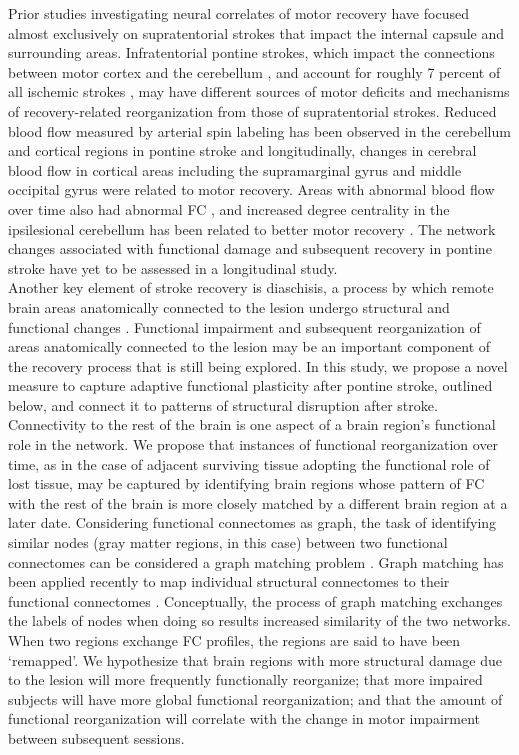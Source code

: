 \documentclass[10pt]{article}
\begin{document}
	Prior studies investigating neural correlates of motor recovery have focused almost exclusively on supratentorial strokes that impact the internal capsule and surrounding areas.  Infratentorial pontine strokes, which impact the connections between motor cortex and the cerebellum \cite{Lu2011-ow}, and account for roughly 7 percent of all ischemic strokes \cite{Saia2009-ik}, may have different sources of motor deficits and mechanisms of recovery-related reorganization from those of supratentorial strokes. Reduced blood flow measured by arterial spin labeling has been observed in the cerebellum and cortical regions in pontine stroke \cite{Wei2020-gj, Wang2019-jr} and longitudinally, changes in cerebral blood flow in cortical areas including the supramarginal gyrus and middle occipital gyrus were related to motor recovery.  Areas with abnormal blood flow over time also had abnormal FC \cite{Wei2020-gj}, and increased degree centrality in the ipsilesional cerebellum has been related to better motor recovery \cite{Liu2019-mj}. The network changes associated with functional damage and subsequent recovery in pontine stroke have yet to be assessed in a longitudinal study.
	\\
	
	Another key element of stroke recovery is diaschisis, a process by which remote brain areas anatomically connected to the lesion undergo structural and functional changes \cite{Carrera2014-ah}. Functional impairment and subsequent reorganization of areas anatomically connected to the lesion may be an important component of the recovery process that is still being explored. In this study, we propose a novel measure to capture adaptive functional plasticity after pontine stroke, outlined below, and connect it to patterns of structural disruption after stroke. 
	\\
	
	Connectivity to the rest of the brain is one aspect of a brain region's functional role in the network. We propose that instances of functional reorganization over time, as in the case of adjacent surviving tissue adopting the functional role of lost tissue, may be captured by identifying brain regions whose pattern of FC with the rest of the brain is more closely matched by a different brain region at a later date. Considering functional connectomes as graph, the task of identifying similar nodes (gray matter regions, in this case) between two functional connectomes can be considered a graph matching problem \cite{Conte2004-ro}. Graph matching has been applied recently to map individual structural connectomes to their functional connectomes \cite{Osmanlioglu2019-ao}. Conceptually, the process of graph matching exchanges the labels of nodes when doing so results increased similarity of the two networks. When two regions exchange FC profiles, the regions are said to have been ‘remapped’. We hypothesize that brain regions with more structural damage due to the lesion will more frequently functionally reorganize; that more impaired subjects will have more global functional reorganization; and that the amount of functional reorganization will correlate with the change in motor impairment between subsequent sessions.
	
\end{document}
